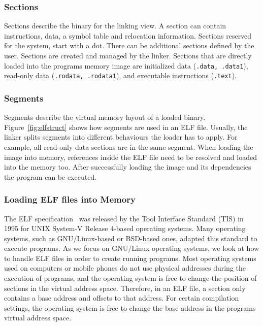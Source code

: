 \subsubsection{Sections}

Sections describe the binary for the linking view. A section can contain
instructions, data, a symbol table and relocation information. Sections reserved
for the system, start with a dot. There can be additional sections defined by
the user. Sections are created and managed by the linker. Sections that are
directly loaded into the program\textquotesingle s memory image are initialized
data (\texttt{.data, .data1}), read-only data (\texttt{.rodata, .rodata1}), and
executable instructions (\texttt{.text}).

\subsubsection{Segments}

Segments describe the virtual memory layout of a loaded binary.
Figure~\ref{fig:elfstruct} shows how segments are used in an ELF file.
Usually, the linker splits segments into different behaviours the loader has to
apply. For example, all read-only data sections are in the same segment. When
loading the image into memory, references inside the ELF file need to be
resolved and loaded into the memory too. After successfully loading the image
and its dependencies the program can be executed.

\subsubsection{Loading ELF files into Memory}

The ELF specification~\cite{elfspec} was released by the Tool Interface Standard
(TIS) in 1995 for UNIX System-V Release 4-based operating systems. Many
operating systems, such as GNU/Linux-based or BSD-based ones, adapted this
standard to execute programs. As we focus on GNU/Linux operating systems, we
look at how to handle ELF files in order to create running programs. Most
operating systems used on computers or mobile phones do not use physical
addresses during the execution of programs, and the operating system is free to
change the position of sections in the virtual address space. Therefore, in an
ELF file, a section only contains a base address and offsets to that address.
For certain compilation settings, the operating system is free to change the
base address in the programs virtual address space.

